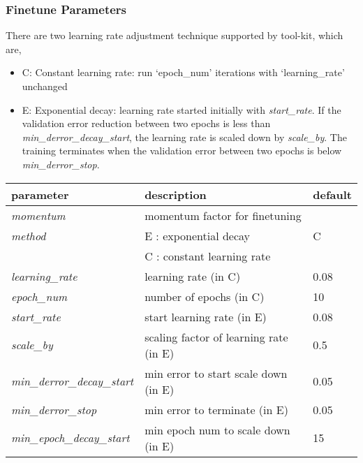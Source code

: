\subsubsection{Finetune Parameters}
\label{subsec:finetuneparam}
There are two learning rate adjustment technique supported by tool-kit, which are,
\begin{itemize}
\item C: Constant learning rate: run `epoch\_num' iterations with `learning\_rate' unchanged
\item E: Exponential decay: learning rate started initially with \emph{start\_rate}.  If the validation error reduction between two epochs is less than \emph{min\_derror\_decay\_start}, the learning rate is scaled down by \emph{scale\_by}.  The training terminates when the validation error between two epochs is below \emph{min\_derror\_stop}.
\end{itemize}
\begin{table}[h]
\centering
\begin{tabular}{|l|l|l|}
\hline
\textbf{parameter}	& \textbf{description} 				& \textbf{default}\\  \hline
\emph{momentum} 			& momentum factor for finetuning 				& \\
\emph{method} 				& E : exponential decay 						& C\\
					& C : constant learning rate 						& \\
\emph{learning\_rate}   	& learning rate (in C) 							& 0.08\\
\emph{epoch\_num}          & number of epochs (in C) 			 		& 10\\
\emph{start\_rate}         & start learning rate (in E) 					& 0.08 \\
\emph{scale\_by}           & scaling factor of learning rate (in E)		& 0.5\\
\emph{min\_derror\_decay\_start}& min error to start scale down (in E) 	& 0.05\\
\emph{min\_derror\_stop}   & min error to terminate (in E) 	& 0.05 \\
\emph{min\_epoch\_decay\_start}  & min epoch num to scale down (in E)	& 15\\
\hline
\end{tabular}
\end{table} 
 
\clearpage

